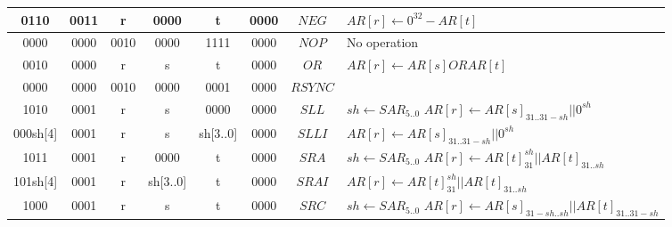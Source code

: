 \begin{longtable}{llllllllllllllllllllllll  p{1cm}  p{6cm} | }
		\multicolumn{4}{|c|}{0110} & \multicolumn{4}{c|}{0011} & \multicolumn{4}{c|}{r} & \multicolumn{4}{c|}{0000} & \multicolumn{4}{c|}{t} & \multicolumn{4}{c|}{0000} & \multicolumn{1}{c|}{$NEG$} & $AR[r] \leftarrow 0^{32}-AR[t]$ \\ \hline
		\multicolumn{4}{|c|}{0000} & \multicolumn{4}{c|}{0000} & \multicolumn{4}{c|}{0010} & \multicolumn{4}{c|}{0000} & \multicolumn{4}{c|}{1111} & \multicolumn{4}{c|}{0000} & \multicolumn{1}{c|}{$NOP$} &  No operation \\ \hline
        \multicolumn{4}{|c|}{0010} & \multicolumn{4}{c|}{0000} & \multicolumn{4}{c|}{r} & \multicolumn{4}{c|}{s} & \multicolumn{4}{c|}{t} & \multicolumn{4}{c|}{0000} & \multicolumn{1}{c|}{$OR$} & $AR[r] \leftarrow AR[s] OR AR[t]$ \\ \hline		\multicolumn{4}{|c|}{0000} & \multicolumn{4}{c|}{0000} & \multicolumn{4}{c|}{0010} & \multicolumn{4}{c|}{0000} & \multicolumn{4}{c|}{0001} & \multicolumn{4}{c|}{0000} & \multicolumn{1}{c|}{$RSYNC$} &  \\ \hline
        \multicolumn{4}{|c|}{1010} & \multicolumn{4}{c|}{0001} & \multicolumn{4}{c|}{r} & \multicolumn{4}{c|}{s} & \multicolumn{4}{c|}{0000} & \multicolumn{4}{c|}{0000} & \multicolumn{1}{c|}{$SLL$} & $sh \leftarrow SAR_{5..0}$ \newline $AR[r] \leftarrow AR[s]_{31..31-sh} || 0^{sh}$ \\ \hline
        \multicolumn{4}{|c|}{000sh[4]} & \multicolumn{4}{c|}{0001} & \multicolumn{4}{c|}{r} & \multicolumn{4}{c|}{s} & \multicolumn{4}{c|}{sh[3..0]} & \multicolumn{4}{c|}{0000} & \multicolumn{1}{c|}{$SLLI$} & $AR[r] \leftarrow AR[s]_{31..31-sh} || 0^{sh}$ \\ \hline
        \multicolumn{4}{|c|}{1011} & \multicolumn{4}{c|}{0001} & \multicolumn{4}{c|}{r} & \multicolumn{4}{c|}{0000} & \multicolumn{4}{c|}{t} & \multicolumn{4}{c|}{0000} & \multicolumn{1}{c|}{$SRA$} & $sh \leftarrow SAR_{5..0}$ \newline $AR[r] \leftarrow AR[t]_{31}^{sh} || AR[t]_{31..sh}$ \\ \hline
        \multicolumn{4}{|c|}{101sh[4]} & \multicolumn{4}{c|}{0001} & \multicolumn{4}{c|}{r} & \multicolumn{4}{c|}{sh[3..0]} & \multicolumn{4}{c|}{t} & \multicolumn{4}{c|}{0000} & \multicolumn{1}{c|}{$SRAI$} & $AR[r] \leftarrow AR[t]_{31}^{sh} || AR[t]_{31..sh}$ \\ \hline
        \multicolumn{4}{|c|}{1000} & \multicolumn{4}{c|}{0001} & \multicolumn{4}{c|}{r} & \multicolumn{4}{c|}{s} & \multicolumn{4}{c|}{t} & \multicolumn{4}{c|}{0000} & \multicolumn{1}{c|}{$SRC$} & $sh \leftarrow SAR_{5..0}$ \newline $AR[r] \leftarrow AR[s]_{31-sh..sh} || AR[t]_{31..31-sh}$ \\ \hline

\end{longtable}
